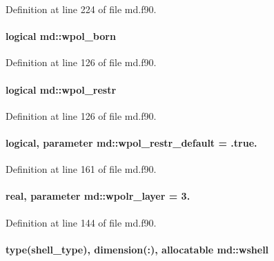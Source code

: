 Definition at line 224 of file md.\-f90.

\hypertarget{classmd_ad8a49d857cf76b62d113486eeee13176}{
\paragraph[{wpol\-\_\-born}]{\setlength{\rightskip}{0pt plus 5cm}logical md\-::wpol\-\_\-born}}\label{classmd_ad8a49d857cf76b62d113486eeee13176}


Definition at line 126 of file md.\-f90.

\hypertarget{classmd_ac3c563ce9e3f84e9532f17144c5f67b0}{
\paragraph[{wpol\-\_\-restr}]{\setlength{\rightskip}{0pt plus 5cm}logical md\-::wpol\-\_\-restr}}\label{classmd_ac3c563ce9e3f84e9532f17144c5f67b0}


Definition at line 126 of file md.\-f90.

\hypertarget{classmd_a22b5128b346ba076ccd5d1b2ccdf2fb3}{
\paragraph[{wpol\-\_\-restr\-\_\-default}]{\setlength{\rightskip}{0pt plus 5cm}logical, parameter md\-::wpol\-\_\-restr\-\_\-default = .true.}}\label{classmd_a22b5128b346ba076ccd5d1b2ccdf2fb3}


Definition at line 161 of file md.\-f90.

\hypertarget{classmd_a2b1061412b67a4928eba17cba519bf1f}{
\paragraph[{wpolr\-\_\-layer}]{\setlength{\rightskip}{0pt plus 5cm}real, parameter md\-::wpolr\-\_\-layer = 3.}}\label{classmd_a2b1061412b67a4928eba17cba519bf1f}


Definition at line 144 of file md.\-f90.

\hypertarget{classmd_a10ddccddacedb6f3a62458f2222eb70f}{
\paragraph[{wshell}]{\setlength{\rightskip}{0pt plus 5cm}type({\bf shell\-\_\-type}), dimension(\-:), allocatable md\-::wshell}}\label{classmd_a10ddccddacedb6f3a62458f2222eb70f}


